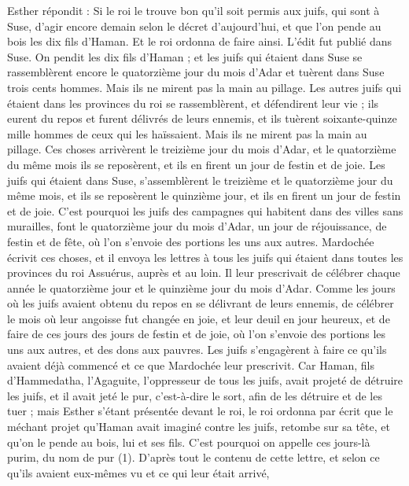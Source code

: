 \begin{multicols}{2}
Esther répondit : Si le roi le trouve bon qu'il soit permis aux juifs, qui sont à Suse, d’agir encore demain selon le décret d’aujourd'hui, et que l'on pende au bois les dix fils d'Haman.
Et le roi ordonna de faire ainsi. L'édit fut publié dans Suse. On pendit les dix fils d'Haman ;
et les juifs qui étaient dans Suse se rassemblèrent encore le quatorzième jour du mois d'Adar et tuèrent dans Suse trois cents hommes. Mais ils ne mirent pas la main au pillage.
Les autres juifs qui étaient dans les provinces du roi se rassemblèrent, et défendirent leur vie ; ils eurent du repos et furent délivrés de leurs ennemis, et ils tuèrent soixante-quinze mille hommes de ceux qui les haïssaient. Mais ils ne mirent pas la main au pillage.
Ces choses arrivèrent le treizième jour du mois d'Adar, et le quatorzième du même mois ils se reposèrent, et ils en firent un jour de festin et de joie.
Les juifs qui étaient dans Suse, s'assemblèrent le treizième et le quatorzième jour du même mois, et ils se reposèrent le quinzième jour, et ils en firent un jour de festin et de joie.
C'est pourquoi les juifs des campagnes qui habitent dans des villes sans murailles, font le quatorzième jour du mois d'Adar, un jour de réjouissance, de festin et de fête, où l’on s’envoie des portions les uns aux autres.
Mardochée écrivit ces choses, et il envoya les lettres à tous les juifs qui étaient dans toutes les provinces du roi Assuérus, auprès et au loin.
Il leur prescrivait de célébrer chaque année le quatorzième jour et le quinzième jour du mois d'Adar.
Comme les jours où les juifs avaient obtenu du repos en se délivrant de leurs ennemis, de célébrer le mois où leur angoisse fut changée en joie, et leur deuil en jour heureux, et de faire de ces jours des jours de festin et de joie, où l’on s’envoie des portions les uns aux autres, et des dons aux pauvres.
Les juifs s’engagèrent à faire ce qu’ils avaient déjà commencé et ce que Mardochée leur prescrivit.
Car Haman, fils d'Hammedatha, l’Agaguite, l'oppresseur de tous les juifs, avait projeté de détruire les juifs, et il avait jeté le pur, c'est-à-dire le sort, afin de les détruire et de les tuer ;
mais Esther s’étant présentée devant le roi, le roi ordonna par écrit que le méchant projet qu'Haman avait imaginé contre les juifs, retombe sur sa tête, et qu'on le pende au bois, lui et ses fils.
C'est pourquoi on appelle ces jours-là purim, du nom de pur (1). D’après tout le contenu de cette lettre, et selon ce qu’ils avaient eux-mêmes vu et ce qui leur était arrivé,

\end{multicols}
